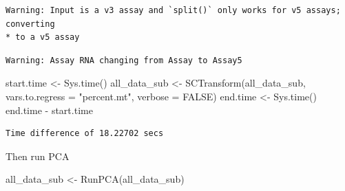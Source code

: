 \documentclass[
  letterpaper,
  DIV=11,
  numbers=noendperiod]{scrreprt}
\newenvironment{Shaded}{\begin{snugshade}}{\end{snugshade}}
\newcommand{\AttributeTok}[1]{\textcolor[rgb]{0.40,0.45,0.13}{#1}}
\newcommand{\ConstantTok}[1]{\textcolor[rgb]{0.56,0.35,0.01}{#1}}
\newcommand{\FunctionTok}[1]{\textcolor[rgb]{0.28,0.35,0.67}{#1}}
\newcommand{\NormalTok}[1]{\textcolor[rgb]{0.00,0.23,0.31}{#1}}
\newcommand{\OtherTok}[1]{\textcolor[rgb]{0.00,0.23,0.31}{#1}}
\newcommand{\SpecialCharTok}[1]{\textcolor[rgb]{0.37,0.37,0.37}{#1}}
\newcommand{\StringTok}[1]{\textcolor[rgb]{0.13,0.47,0.30}{#1}}
\begin{document}
\begin{Shaded}
\end{Shaded}

\begin{verbatim}
Warning: Input is a v3 assay and `split()` only works for v5 assays; converting
* to a v5 assay
\end{verbatim}

\begin{verbatim}
Warning: Assay RNA changing from Assay to Assay5
\end{verbatim}

\begin{Shaded}
\begin{Highlighting}[]
\NormalTok{start.time }\OtherTok{\textless{}{-}} \FunctionTok{Sys.time}\NormalTok{()}
\NormalTok{all\_data\_sub }\OtherTok{\textless{}{-}} \FunctionTok{SCTransform}\NormalTok{(all\_data\_sub, }\AttributeTok{vars.to.regress =} \StringTok{"percent.mt"}\NormalTok{, }\AttributeTok{verbose =} \ConstantTok{FALSE}\NormalTok{)}
\NormalTok{end.time }\OtherTok{\textless{}{-}} \FunctionTok{Sys.time}\NormalTok{()}
\NormalTok{end.time }\SpecialCharTok{{-}}\NormalTok{ start.time}
\end{Highlighting}
\end{Shaded}

\begin{verbatim}
Time difference of 18.22702 secs
\end{verbatim}

Then run PCA

\begin{Shaded}
\begin{Highlighting}[]
\NormalTok{all\_data\_sub }\OtherTok{\textless{}{-}} \FunctionTok{RunPCA}\NormalTok{(all\_data\_sub)}
\end{Highlighting}
\end{Shaded}
\end{document}
